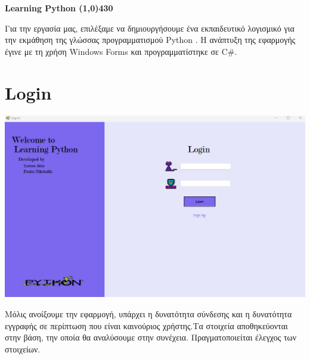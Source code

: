\documentclass[12pt]{article}
\newcommand{\en}[1]{\foreignlanguage{English}{#1}}
\begin{document}
\begin{center}
 \LARGE\bfseries \en{Learning Python}
 \line(1,0){430}
\end{center}


\newline

 Για την εργασία μας, επιλέξαμε να δημιουργήσουμε ένα εκπαιδευτικό λογισμικό για την εκμάθηση της γλώσσας προγραμματισμού \en{Python} . Η ανάπτυξη της εφαρμογής έγινε με τη χρήση \en{Windows Forms} και προγραμματίστηκε σε \en{C\#}.

\section*{\en{Login}}
\begin{center}
    
    \includegraphics[width=1.1\linewidth]{login.png}
\end{center}

Μόλις ανοίξουμε την εφαρμογή, υπάρχει η δυνατότητα σύνδεσης και η δυνατότητα εγγραφής σε περίπτωση που είναι καινούριος χρήστης.Τα στοιχεία αποθηκεύονται στην βάση, την οποία θα αναλύσουμε στην συνέχεια. Πραγματοποιείται έλεγχος των στοιχείων.
\end{document}
